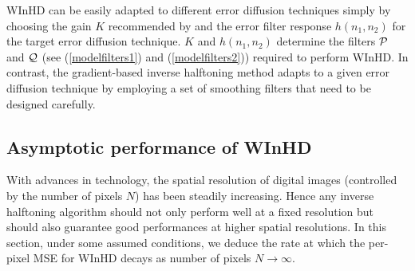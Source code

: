 \documentclass[11pt]{article}
\def\nnnx {n_1}
\def\nnny {n_2}
\def\fffx {f_1}
\def\fffy {f_2}
\def\NSQ{N}
\def\cP { {\cal{P}} }
\def\cQ { {\cal{Q}} }
\begin{document}
\begin{comment}
Figure \ref{floydnoise} illustrates the
power spectrum $\frac{|Q(\fffx,\fffy)|^2}{|P(\fffx,\fffy)|^2}\sigma^2$
of the residual noise $\cP^{-1}\,\cQ\, \gamma(\nnnx,\nnny)$ corrupting
$\widetilde{x}(\nnnx,\nnny)$. 
\begin{figure}[tb]
\begin{center}
\begin{tabular}{ccc}
\epsfig{figure=figures/FloydNoise.eps,width=3in}&\hspace{5mm}&\epsfig{figure=figures/JarvisNoise.eps,width=3in}\\
(a) Floyd & &(b) Jarvis
\end{tabular}
\end{center}
\caption[Noise Spectrum]{\small \sl {Plots (a) and (b) respectively
illustrate the radially-averaged power spectrum
$\frac{|Q(\fffx,\fffy)|^2}{|P(\fffx,\fffy)|^2}\sigma^2$ of the noise
attenuated by WInHD's wavelet-domain shrinkage (Step 2) while inverse
halftoning Floyd and Jarvis halftones.}}
\label{floydnoise}
\end{figure}
\end{comment}

\mbox{WInHD} can be easily adapted to different error diffusion
techniques simply by choosing the gain $K$
recommended by \cite{Kite} and the error filter response
$h(\nnnx,\nnny)$ for the target error diffusion technique. $K$ and
$h(\nnnx,\nnny)$ determine the filters $\cP$ and $\cQ$ (see
(\ref{modelfilters1}) and (\ref{modelfilters2})) required to
perform \mbox{WInHD}. In contrast, the gradient-based
inverse halftoning method \cite{gradient_halftoning} adapts to a given
error diffusion technique by employing a set of smoothing filters that
need to be designed carefully.



\sloppy
\subsection{Asymptotic performance of \mbox{WInHD}}
\label{Optimality}

With advances in technology, the spatial resolution of digital images
(controlled by the number of pixels $\NSQ $) has been steadily increasing.
Hence any inverse halftoning algorithm should not only perform well
at a fixed resolution but should also guarantee good performances at
higher spatial resolutions. In this section, under some assumed
conditions, we deduce the rate at which the per-pixel MSE for 
\mbox{WInHD} decays as number of pixels $N \rightarrow \infty$.
\end{document}
